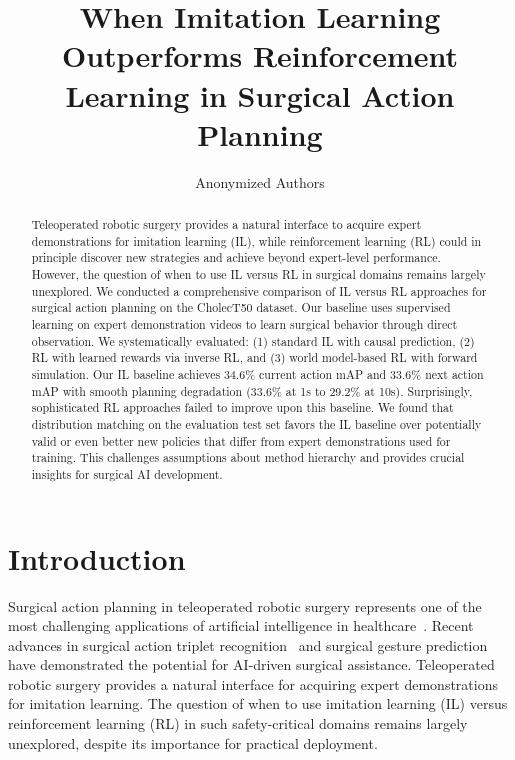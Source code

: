 \documentclass[runningheads]{llncs}
\begin{document}
%
\title{When Imitation Learning Outperforms Reinforcement Learning in Surgical Action Planning}
%
\author{Anonymized Authors}

\maketitle              %
%
\begin{abstract}
Teleoperated robotic surgery provides a natural interface to acquire expert demonstrations for imitation learning (IL), while reinforcement learning (RL) could in principle discover new strategies and achieve beyond expert-level performance. However, the question of when to use IL versus RL in surgical domains remains largely unexplored. We conducted a comprehensive comparison of IL versus RL approaches for surgical action planning on the CholecT50 dataset. Our baseline uses supervised learning on expert demonstration videos to learn surgical behavior through direct observation. We systematically evaluated: (1) standard IL with causal prediction, (2) RL with learned rewards via inverse RL, and (3) world model-based RL with forward simulation. Our IL baseline achieves 34.6\% current action mAP and 33.6\% next action mAP with smooth planning degradation (33.6\% at 1s to 29.2\% at 10s). Surprisingly, sophisticated RL approaches failed to improve upon this baseline. We found that distribution matching on the evaluation test set favors the IL baseline over potentially valid or even better new policies that differ from expert demonstrations used for training. This challenges assumptions about method hierarchy and provides crucial insights for surgical AI development.

\end{abstract}


\section{Introduction}

Surgical action planning in teleoperated robotic surgery represents one of the most challenging applications of artificial intelligence in healthcare~\cite{nwoye2022cholect50,nwoye2020recognition}. Recent advances in surgical action triplet recognition~\cite{nwoye2023cholectriplet2021} and surgical gesture prediction~\cite{shi2022recognition,weerasinghe2024multimodal} have demonstrated the potential for AI-driven surgical assistance. Teleoperated robotic surgery provides a natural interface for acquiring expert demonstrations for imitation learning. The question of when to use imitation learning (IL) versus reinforcement learning (RL) in such safety-critical domains remains largely unexplored, despite its importance for practical deployment.
\end{document}
